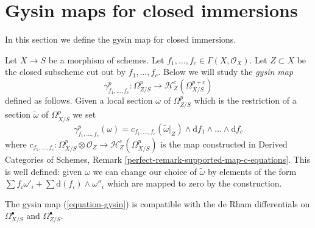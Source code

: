 \section{Gysin maps for closed immersions}
\label{section-gysin}

\noindent
In this section we define the gysin map for closed immersions.

\begin{remark}
\label{remark-gysin-equations}
Let $X \to S$ be a morphism of schemes. Let
$f_1, \ldots, f_c \in \Gamma(X, \mathcal{O}_X)$. Let $Z \subset X$
be the closed subscheme cut out by $f_1, \ldots, f_c$. Below we will
study the {\it gysin map}
\begin{equation}
\label{equation-gysin}
\gamma^p_{f_1, \ldots, f_c} :
\Omega^p_{Z/S}
\longrightarrow
\mathcal{H}_Z^c(\Omega^{p + c}_{X/S})
\end{equation}
defined as follows. Given a local section $\omega$ of $\Omega^p_{Z/S}$
which is the restriction of a section $\tilde \omega$ of $\Omega^p_{X/S}$
we set
$$
\gamma^p_{f_1, \ldots, f_c}(\omega) =
c_{f_1, \ldots, f_c}(\tilde \omega|_Z) \wedge
\text{d}f_1 \wedge \ldots \wedge \text{d}f_c
$$
where $c_{f_1, \ldots, f_c} : \Omega^p_{X/S} \otimes \mathcal{O}_Z \to
\mathcal{H}_Z^c(\Omega^p_{X/S})$ is the map constructed in
Derived Categories of Schemes, Remark
\ref{perfect-remark-supported-map-c-equations}.
This is well defined: given $\omega$ we can change our choice of
$\tilde \omega$ by elements of the form
$\sum f_i \omega'_i + \sum \text{d}(f_i) \wedge \omega''_i$
which are mapped to zero by the construction.
\end{remark}

\begin{lemma}
\label{lemma-gysin-differential}
The gysin map (\ref{equation-gysin}) is compatible with the de Rham
differentials on $\Omega^\bullet_{X/S}$ and $\Omega^\bullet_{Z/S}$.
\end{lemma}

